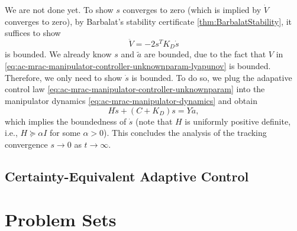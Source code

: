 \documentclass[
]{book}
\theoremstyle{definition}
\theoremstyle{definition}
\theoremstyle{definition}
\theoremstyle{definition}
\theoremstyle{remark}
\begin{document}
We are not done yet. To show \(s\) converges to zero (which is implied by \(\dot{V}\) converges to zero), by Barbalat's stability certificate \ref{thm:BarbalatStability}, it suffices to show
\[
\ddot{V} = -2 s^T K_D \dot{s}
\]
is bounded. We already know \(s\) and \(\tilde{a}\) are bounded, due to the fact that \(V\) in \eqref{eq:ac-mrac-manipulator-controller-unknownparam-lyapunov} is bounded. Therefore, we only need to show \(\dot{s}\) is bounded. To do so, we plug the adapative control law \eqref{eq:ac-mrac-manipulator-controller-unknownparam} into the manipulator dynamics \eqref{eq:ac-mrac-manipulator-dynamics} and obtain
\[
H \dot{s} + (C + K_D) s = Y\tilde{a},
\]
which implies the boundedness of \(\dot{s}\) (note that \(H\) is uniformly positive definite, i.e., \(H \succeq \alpha I\) for some \(\alpha > 0\)). This concludes the analysis of the tracking convergence \(s \rightarrow 0\) as \(t \rightarrow \infty\).

\hypertarget{certainty-equivalent-adaptive-control}{%
\section{Certainty-Equivalent Adaptive Control}\label{certainty-equivalent-adaptive-control}}

\hypertarget{psets}{%
\chapter{Problem Sets}\label{psets}}
\end{document}
